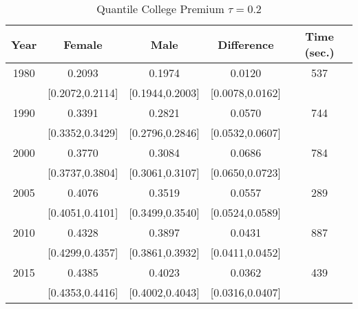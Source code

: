 \begin{table}[ht]
\centering
\begin{tabular}{ccccc}
  \hline
Year & Female & Male & Difference & Time (sec.) \\ 
  \hline
1980 & 0.2093 & 0.1974 & 0.0120 & 537 \\ 
   & [0.2072,0.2114] & [0.1944,0.2003] & [0.0078,0.0162] &  \\ 
  1990 & 0.3391 & 0.2821 & 0.0570 & 744 \\ 
   & [0.3352,0.3429] & [0.2796,0.2846] & [0.0532,0.0607] &  \\ 
  2000 & 0.3770 & 0.3084 & 0.0686 & 784 \\ 
   & [0.3737,0.3804] & [0.3061,0.3107] & [0.0650,0.0723] &  \\ 
  2005 & 0.4076 & 0.3519 & 0.0557 & 289 \\ 
   & [0.4051,0.4101] & [0.3499,0.3540] & [0.0524,0.0589] &  \\ 
  2010 & 0.4328 & 0.3897 & 0.0431 & 887 \\ 
   & [0.4299,0.4357] & [0.3861,0.3932] & [0.0411,0.0452] &  \\ 
  2015 & 0.4385 & 0.4023 & 0.0362 & 439 \\ 
   & [0.4353,0.4416] & [0.4002,0.4043] & [0.0316,0.0407] &  \\ 
   \hline
\end{tabular}
\caption{Quantile College Premium $\tau=0.2$} 
\end{table}
